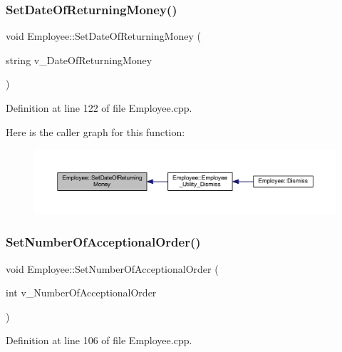 \subsubsection{\texorpdfstring{Set\+Date\+Of\+Returning\+Money()}{SetDateOfReturningMoney()}}
{\footnotesize\ttfamily void Employee\+::\+Set\+Date\+Of\+Returning\+Money (\begin{DoxyParamCaption}\item[{string}]{v\+\_\+\+Date\+Of\+Returning\+Money }\end{DoxyParamCaption})}



Definition at line 122 of file Employee.\+cpp.

Here is the caller graph for this function\+:
\nopagebreak
\begin{figure}[H]
\begin{center}
\leavevmode
\includegraphics[width=350pt]{class_employee_a3ffb3c8c2dc4817f88801be832eb8caa_icgraph}
\end{center}
\end{figure}
\mbox{\label{class_employee_ae0a2d5a5ec36af567bc7e434d18de422}} 
\subsubsection{\texorpdfstring{Set\+Number\+Of\+Acceptional\+Order()}{SetNumberOfAcceptionalOrder()}}
{\footnotesize\ttfamily void Employee\+::\+Set\+Number\+Of\+Acceptional\+Order (\begin{DoxyParamCaption}\item[{int}]{v\+\_\+\+Number\+Of\+Acceptional\+Order }\end{DoxyParamCaption})}



Definition at line 106 of file Employee.\+cpp.

